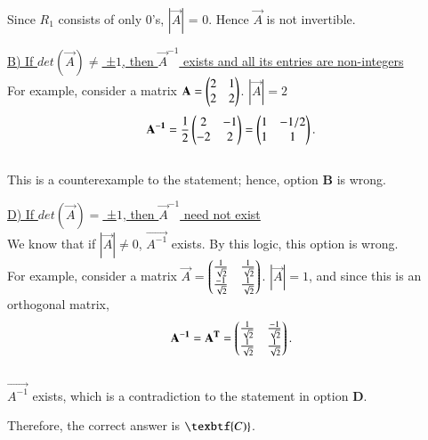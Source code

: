 \documentclass[12pt]{article}
\begin{document}
Since $R_1$ consists of only 0's, $|\vec{A}|$ = 0. Hence $\vec{A}$ is not invertible.
\vspace{1.5cm}

\underline{B) If $det(\vec{A})\neq $ ±$1$, then $\vec{A}^{-1}$ exists and all its entries are non-integers}\\

For example, consider a matrix $\mathbf{A} = \begin{pmatrix}2 & 1 \\ 2 & 2\end{pmatrix}$. $|\vec{A}| = 2$
\begin{align*}
    \mathbf{A^{-1}} = \frac{1}{2}\begin{pmatrix}2 & -1 \\ -2 & 2\end{pmatrix} = \begin{pmatrix}1 & -1/2 \\ 1 & 1\end{pmatrix}.
\end{align*}\\

This is a counterexample to the statement; hence, option \textbf{B} is wrong.

\vspace{1cm}
\underline{D) If $det(\vec{A})= $ ±$1$, then $\vec{A}^{-1}$ need not exist}\\

We know that if $|\vec{A}| \neq 0$, $\vec{A^{-1}}$ exists. By this logic, this option is wrong.\\

For example, consider a matrix $\vec{A}$ = $\begin{pmatrix}\frac{1}{\sqrt{2}} & \frac{1}{\sqrt{2}} \\ \frac{-1}{\sqrt{2}} & \frac{1}{\sqrt{2}}\end{pmatrix}$. $|\vec{A}| = 1$, and since this is an orthogonal matrix, 
\begin{align*}
\mathbf{A^{-1}} = \mathbf{A^T} = \begin{pmatrix}\frac{1}{\sqrt{2}} & \frac{-1}{\sqrt{2}} \\ \frac{1}{\sqrt{2}} & \frac{1}{\sqrt{2}}\end{pmatrix}. \end{align*}\\

$\vec{A^{-1}}$ exists, which is a contradiction to the statement in option \textbf{D}.


Therefore, the correct answer is $\texbtf{C)}$.
\end{document}
